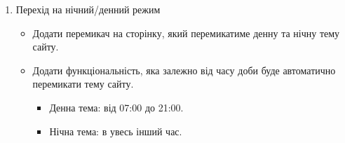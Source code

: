 \documentclass[12pt, a4paper]{article}
\begin{document}
\begin{enumerate}
\begin{itemize}
			\item Після натискання на кнопку "Надіслати", форма має надсилатися на електронну пошту студента.
			\item Зареєструйтесь на сайті Formspree. Ця платформа дозволяє надсилати до 50 листів на місяць безкоштовно без жодної конфігурації вашого власного сервера.
			\item Створіть нову форму (отримайте унікальний endpoint для обробки).
			\item Змініть тег \verb|<form>| у своєму HTML, на щось подібне: \verb|<form action="https://formspree.io/f/..." method="POST">|. Це дозволить надіслати дані на сервер, який уже обробить цей запит і надішле вам електронного листа із вмістом форми.
		\end{itemize}
	\item Перехід на нічний/денний режим
		\begin{itemize}
			\item Додати перемикач на сторінку, який перемикатиме денну та нічну тему сайту.
			\item Додати функціональність, яка залежно від часу доби буде автоматично перемикати тему сайту.
				\begin{itemize}
					\item Денна тема: від 07:00 до 21:00.
					\item Нічна тема: в увесь інший час.
				\end{itemize}
		\end{itemize}
\end{enumerate}
\end{document}
